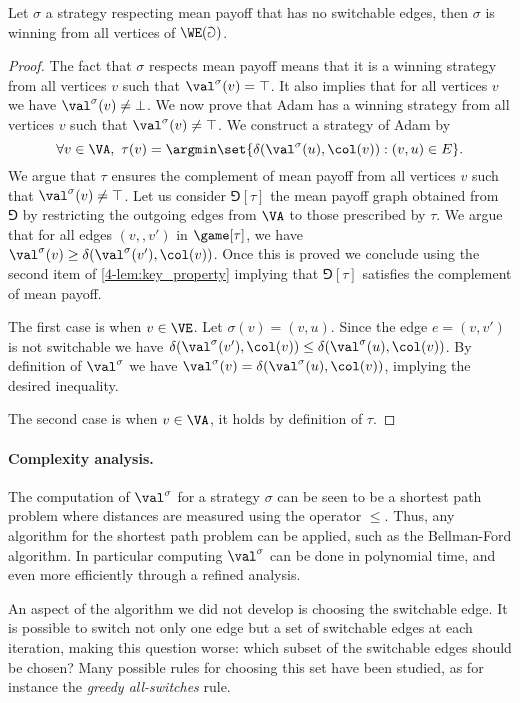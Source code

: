\begin{lemma}[Optimality]
Let $\sigma$ a strategy respecting mean payoff that has no switchable edges, then 
$\sigma$ is winning from all vertices of $\WE(\Game)$.
\end{lemma}

\begin{proof}
The fact that $\sigma$ respects mean payoff means that it is a winning strategy
from all vertices $v$ such that $\val^\sigma(v) = \top$.
It also implies that for all vertices $v$ we have $\val^{\sigma}(v) \neq \bot$.
We now prove that Adam has a winning strategy from all vertices $v$ such that $\val^{\sigma}(v) \neq \top$.
We construct a strategy of Adam by
\[
\forall v \in \VA,\ \tau(v) = \argmin \set{ \delta(\val^{\sigma}(u),\col(v)) : (v,u) \in E }.
\]
We argue that $\tau$ ensures the complement of mean payoff from all vertices $v$ such that $\val^{\sigma}(v) \neq \top$.
Let us consider $\Game[\tau]$ the mean payoff graph obtained from $\Game$ by restricting the outgoing edges from $\VA$
to those prescribed by $\tau$.
We argue that for all edges $(v,,v')$ in $\game[\tau]$, we have 
$\val^{\sigma}(v) \ge \delta(\val^{\sigma}(v'),\col(v))$.
Once this is proved we conclude using the second item of \cref{4-lem:key_property} implying that $\Game[\tau]$ satisfies the complement of mean payoff.

The first case is when $v \in \VE$. 
Let $\sigma(v) = (v,u)$.
Since the edge $e = (v,v')$ is not switchable we have 
$\delta(\val^{\sigma}(v'),\col(v)) \le \delta(\val^{\sigma}(u),\col(v))$.
By definition of $\val^\sigma$ we have $\val^\sigma(v) = \delta(\val^{\sigma}(u),\col(v))$,
implying the desired inequality.

The second case is when $v \in \VA$, it holds by definition of $\tau$.
\end{proof}

\paragraph{\bf Complexity analysis.}
The computation of $\val^\sigma$ for a strategy $\sigma$ can be seen to be a shortest path problem where distances are measured using the operator $\le$. 
Thus, any algorithm for the shortest path problem can be applied, such as the Bellman-Ford algorithm.
In particular computing $\val^\sigma$ can be done in polynomial time, and even more efficiently through a refined analysis.

An aspect of the algorithm we did not develop is choosing the switchable edge.
It is possible to switch not only one edge but a set of switchable edges at each iteration, making this question worse: 
which subset of the switchable edges should be chosen?
Many possible rules for choosing this set have been studied, as for instance the \emph{greedy all-switches} rule. 

